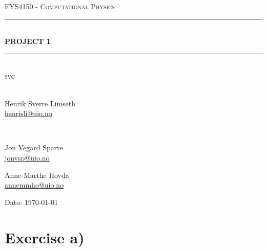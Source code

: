 \documentclass[norsk, 12pt]{article}
\begin{document}
\begin{titlepage}
\begin{center}

\textsc{\Large FYS4150 - Computational Physics}\\[0.5cm]
\rule{\linewidth}{0.5mm} \\[0.4cm]
{ \huge \bfseries  PROJECT 1}\\[0.10cm]
\rule{\linewidth}{0.5mm} \\[1.5cm]
\textsc{\Large svc}\\[1.5cm]
\textsc{}\\[1.5cm]

\begin{minipage}{0.49\textwidth}
    \begin{center} \large
        Henrik Sverre Limseth\\ \url{henrisli@uio.no} \\[0.8cm]
    \end{center}
\end{minipage}
\bigskip \\
\begin{minipage}{0.49\textwidth}
    \begin{center} \large
        Jon Vegard Sparre\\ \url{jonvsp@uio.no} \\[0.8cm]
    \end{center}
\end{minipage}
\begin{minipage}{0.49\textwidth}
    \begin{center} \large
        Anne-Marthe Hovda\\ \url{annemmho@uio.no} \\[0.8cm]
    \end{center}
\end{minipage}

\vfill

\large{Dato: \today}

\end{center}
\end{titlepage}


\section*{Exercise a)}
\end{document}
